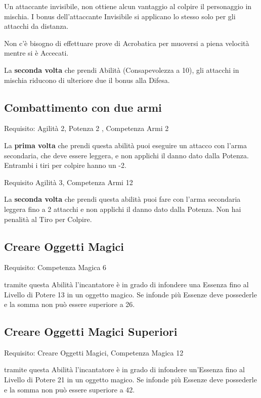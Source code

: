 \documentclass[a4paper,11pt,twoside,openany]{book}
\begin{document}
Un attaccante invisibile, non ottiene alcun vantaggio al colpire il personaggio in mischia. I bonus dell'attaccante Invisibile si applicano lo stesso solo per gli attacchi da distanza.

Non c'è bisogno di effettuare prove di Acrobatica per muoversi a piena velocità mentre si è Accecati.

La \textbf{seconda volta} che prendi Abilità (Consapevolezza a 10), gli attacchi in mischia riducono di ulteriore due il bonus alla Difesa.

\subsection{Combattimento con due armi}

Requisito: Agilità 2, Potenza 2 , Competenza Armi 2

La \textbf{prima volta} che prendi questa abilità puoi eseguire un attacco con l'arma secondaria, che deve essere leggera, e non applichi il danno dato dalla Potenza. Entrambi i tiri per colpire hanno un -2.

Requisito Agilità 3, Competenza Armi 12

La \textbf{seconda volta} che prendi questa abilità puoi fare con l'arma secondaria leggera fino a 2 attacchi e non applichi il danno dato dalla Potenza. Non hai penalità al Tiro per Colpire.

\subsection{Creare Oggetti Magici}

Requisito: Competenza Magica 6

tramite questa Abilità l'incantatore è in grado di infondere una Essenza fino al Livello di Potere 13 in un oggetto magico. Se infonde più Essenze deve possederle e la somma non può essere superiore a 26.

\subsection{Creare Oggetti Magici Superiori}

Requisito: Creare Oggetti Magici, Competenza Magica 12

tramite questa Abilità l'incantatore è in grado di infondere un'Essenza fino al Livello di Potere 21 in un oggetto magico. Se infonde più Essenze deve possederle e la somma non può essere superiore a 42.
\end{document}
